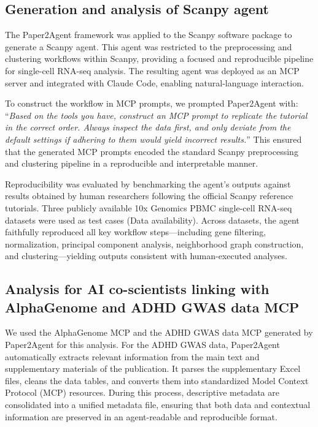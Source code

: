 \documentclass[11pt]{article}
\begin{document}
\subsection*{Generation and analysis of Scanpy agent}
The Paper2Agent framework was applied to the Scanpy software package to generate a Scanpy agent. This agent was restricted to the preprocessing and clustering workflows within Scanpy, providing a focused and reproducible pipeline for single-cell RNA-seq analysis. The resulting agent was deployed as an MCP server and integrated with Claude Code, enabling natural-language interaction.

To construct the workflow in MCP prompts, we prompted Paper2Agent with: “\textit{Based on the tools you have, construct an MCP prompt to replicate the tutorial in the correct order. Always inspect the data first, and only deviate from the default settings if adhering to them would yield incorrect results.}” This ensured that the generated MCP prompts encoded the standard Scanpy preprocessing and clustering pipeline in a reproducible and interpretable manner.

Reproducibility was evaluated by benchmarking the agent’s outputs against results obtained by human researchers following the official Scanpy reference tutorials. Three publicly available 10x Genomics PBMC single-cell RNA-seq datasets were used as test cases (Data availability). Across datasets, the agent faithfully reproduced all key workflow steps—including gene filtering, normalization, principal component analysis, neighborhood graph construction, and clustering—yielding outputs consistent with human-executed analyses.

\subsection*{Analysis for AI co-scientists linking with AlphaGenome and ADHD GWAS data MCP}

We used the AlphaGenome MCP and the ADHD GWAS data MCP generated by Paper2Agent for this analysis. For the ADHD GWAS data, Paper2Agent automatically extracts relevant information from the main text and supplementary materials of the publication. It parses the supplementary Excel files, cleans the data tables, and converts them into standardized Model Context Protocol (MCP) resources. During this process, descriptive metadata are consolidated into a unified metadata file, ensuring that both data and contextual information are preserved in an agent-readable and reproducible format.
\end{document}
